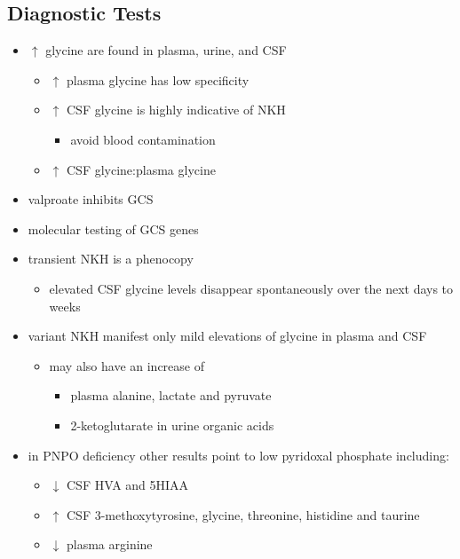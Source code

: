 \documentclass[12pt]{scrartcl}
\begin{document}
\begin{center}
\begin{center}
\subsection{Diagnostic Tests}
\label{sec:orgf57b2b4}
\begin{itemize}
\item \(\uparrow\) glycine are found in plasma, urine, and CSF
\begin{itemize}
\item \(\uparrow\) plasma glycine has low specificity
\item \(\uparrow\) CSF glycine is highly indicative of NKH
\begin{itemize}
\item avoid blood contamination
\end{itemize}
\item \(\uparrow\) CSF glycine:plasma glycine
\end{itemize}
\item valproate inhibits GCS
\item molecular testing of GCS genes
\item transient NKH is a phenocopy
\begin{itemize}
\item elevated CSF glycine levels disappear spontaneously over the next
days to weeks
\end{itemize}
\item variant NKH manifest only mild elevations of glycine in plasma and CSF
\begin{itemize}
\item may also have an increase of
\begin{itemize}
\item plasma alanine, lactate and pyruvate
\item 2-ketoglutarate in urine organic acids
\end{itemize}
\end{itemize}
\item in PNPO deficiency other results point to low pyridoxal phosphate
including:
\begin{itemize}
\item \(\downarrow\) CSF HVA and 5HIAA
\item \(\uparrow\) CSF 3-methoxytyrosine, glycine, threonine, histidine and
taurine
\item \(\downarrow\) plasma arginine
\end{itemize}
\end{itemize}


\end{center}
\end{center}
\end{document}
